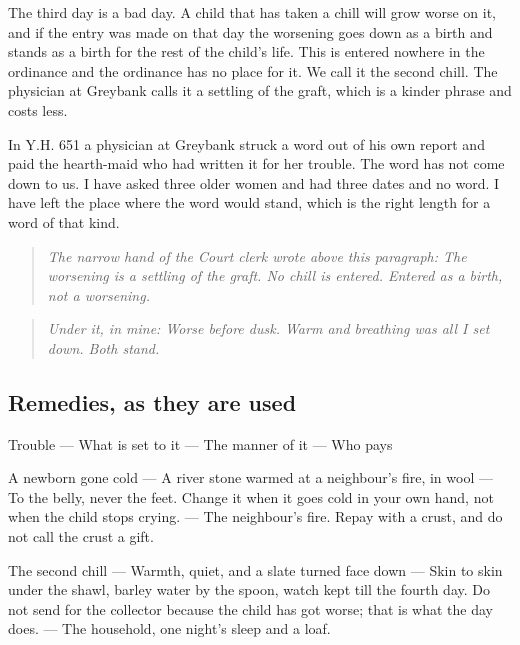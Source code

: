 \documentclass{design/chronicle}
\begin{document}
The third day is a bad day. A child that has taken a chill will grow worse on it, and if the entry was made on that day the worsening goes down as a birth and stands as a birth for the rest of the child’s life. This is entered nowhere in the ordinance and the ordinance has no place for it. We call it the second chill. The physician at Greybank calls it a settling of the graft, which is a kinder phrase and costs less.

In Y.H. 651 a physician at Greybank struck a word out of his own report and paid the hearth-maid who had written it for her trouble. The word has not come down to us. I have asked three older women and had three dates and no word. I have left the place where the word would stand, which is the right length for a word of that kind.

\begin{quote}\itshape \emph{The narrow hand of the Court clerk wrote above this paragraph:} The worsening is a settling of the graft. No chill is entered. Entered as a birth, not a worsening.\end{quote}

\begin{quote}\itshape \end{quote}

\begin{quote}\itshape \emph{Under it, in mine:} Worse before dusk. Warm and breathing was all I set down. Both stand.\end{quote}

\subsection*{Remedies, as they are used}

Trouble — What is set to it — The manner of it — Who pays\par

A newborn gone cold — A river stone warmed at a neighbour’s fire, in wool — To the belly, never the feet. Change it when it goes cold in your own hand, not when the child stops crying. — The neighbour’s fire. Repay with a crust, and do not call the crust a gift.\par

The second chill — Warmth, quiet, and a slate turned face down — Skin to skin under the shawl, barley water by the spoon, watch kept till the fourth day. Do not send for the collector because the child has got worse; that is what the day does. — The household, one night’s sleep and a loaf.\par
\end{document}
